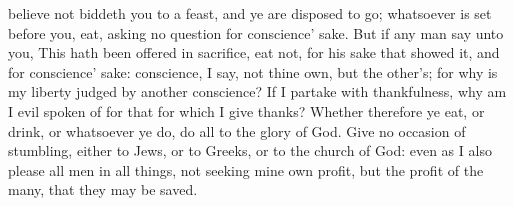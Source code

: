 believe not biddeth you to a feast, and ye are disposed to go; whatsoever is set before you, eat, asking no question for conscience’ sake. But if any man say unto you, This hath been offered in sacrifice, eat not, for his sake that showed it, and for conscience’ sake: conscience, I say, not thine own, but the other’s; for why is my liberty judged by another conscience? If I partake with thankfulness, why am I evil spoken of for that for which I give thanks? Whether therefore ye eat, or drink, or whatsoever ye do, do all to the glory of God. Give no occasion of stumbling, either to Jews, or to Greeks, or to the church of God: even as I also please all men in all things, not seeking mine own profit, but the profit of the many, that they may be saved. 

